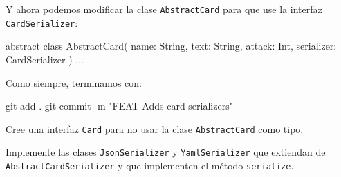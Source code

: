   Y ahora podemos modificar la clase \texttt{AbstractCard} para que use la interfaz \texttt{CardSerializer}:

  \begin{kotlin}
    abstract class AbstractCard(
      name: String, text: String, attack: Int,
      serializer: CardSerializer
    ) {...}
  \end{kotlin}

  Como siempre, terminamos con:

  \begin{powershell}
    git add .
    git commit -m "FEAT Adds card serializers"
  \end{powershell}

  \begin{exercise}
    Cree una interfaz \texttt{Card} para no usar la clase \texttt{AbstractCard} como tipo.
  \end{exercise}
    
  \begin{exercise}
    Implemente las clases \texttt{JsonSerializer} y \texttt{YamlSerializer} que extiendan de
    \texttt{AbstractCardSerializer} y que implementen el método \texttt{serialize}.
  \end{exercise}
